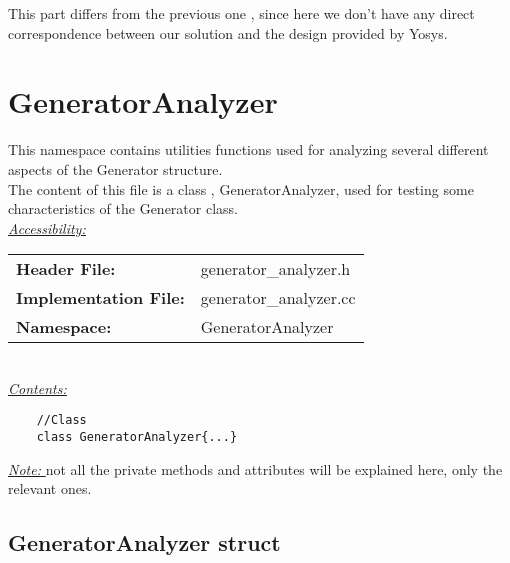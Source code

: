 \documentclass{article}
\newcommand{\sectionbreak}{\clearpage}
\begin{document}
This part differs from the previous one , since here we don't have any direct correspondence between our solution and the design provided by Yosys.\\

\sectionbreak{\clearpage}


\section{GeneratorAnalyzer}

This namespace contains utilities functions used for analyzing several different aspects of the Generator structure.\\

The content of this file is a class , GeneratorAnalyzer, used for testing some characteristics of the Generator class.\\

\underline{\textit{\underline{Accessibility: }}}\\

\begin{tabular}{ll}
	\textbf{Header File:} & generator\_analyzer.h\\
	\textbf{Implementation File:} & generator\_analyzer.cc\\
	\textbf{Namespace: } & GeneratorAnalyzer\\
\end{tabular}\\

\underline{\textit{\underline{Contents: }}}\\

\begin{mdframed}[hidealllines=true, backgroundcolor=green!10]
	\begin{lstlisting}
	//Class
	class GeneratorAnalyzer{...}
	\end{lstlisting}
\end{mdframed}


\underline{\textit{Note: }} not all the private methods and attributes will be explained here, only the relevant ones.

\subsection{GeneratorAnalyzer struct}
\end{document}
